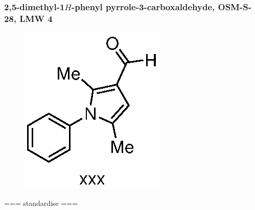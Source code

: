 \documentclass[12pt, a4paper,titlepage]{article}
\begin{document}
\subsubsection*{2,5-dimethyl-1$H$-phenyl pyrrole-3-carboxaldehyde, OSM-S-28, LMW 4}
\label{exp:LMW4}
	\begin{figure}[H]
	\begin{center}
	\includegraphics{exp/LMW4.eps}
	\end{center}
	\vspace{-25pt}	
	\end{figure}	

=== standardise ===
\end{document}
